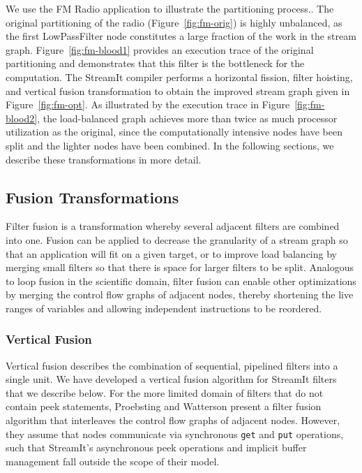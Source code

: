 We use the FM Radio application \cite{pca} to illustrate the
partitioning process..  The original partitioning of the radio
(Figure~\ref{fig:fm-orig}) is highly unbalanced, as the first
LowPassFilter node constitutes a large fraction of the work in the
stream graph.  Figure~\ref{fig:fm-blood1} provides an execution trace
of the original partitioning and demonstrates that this filter is the
bottleneck for the computation.  The StreamIt compiler performs a
horizontal fission, filter hoisting, and vertical fusion
transformation to obtain the improved stream graph given in
Figure~\ref{fig:fm-opt}.  As illustrated by the execution trace in
Figure~\ref{fig:fm-blood2}, the load-balanced graph achieves more than
twice as much processor utilization as the original, since the
computationally intensive nodes have been split and the lighter nodes
have been combined. In the following sections, we describe these
transformations in more detail.

\subsection{Fusion Transformations}

Filter fusion is a transformation whereby several adjacent filters are
combined into one.  Fusion can be applied to decrease the granularity
of a stream graph so that an application will fit on a given target,
or to improve load balancing by merging small filters so that there is
space for larger filters to be split.  Analogous to loop fusion in the
scientific domain, filter fusion can enable other optimizations by
merging the control flow graphs of adjacent nodes, thereby shortening
the live ranges of variables and allowing independent instructions to
be reordered.

\subsubsection{Vertical Fusion}

Vertical fusion describes the combination of sequential, pipelined
filters into a single unit.  We have developed a vertical fusion
algorithm for StreamIt filters that we describe below.  For the more
limited domain of filters that do not contain peek statements,
Proebsting and Watterson \cite{pro96} present a filter fusion
algorithm that interleaves the control flow graphs of adjacent nodes.
However, they assume that nodes communicate via synchronous {\tt get}
and {\tt put} operations, such that StreamIt's asynchronous peek
operations and implicit buffer management fall outside the scope of
their model.

